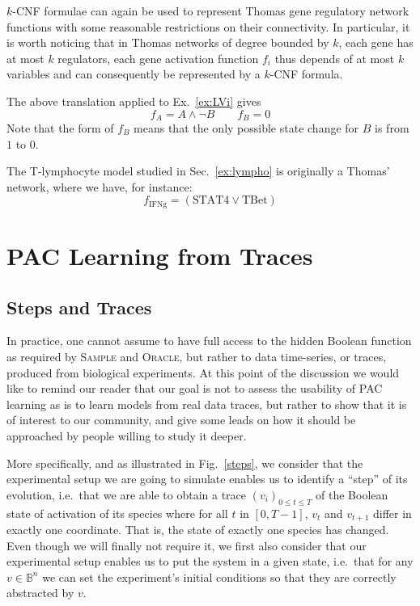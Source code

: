 \documentclass{llncs}
\begin{document}
$k$-CNF formulae can again be used to represent Thomas gene regulatory network functions with some reasonable restrictions on their connectivity.
In particular, it is worth noticing that in Thomas networks of degree bounded by $k$,
each gene has at most $k$ regulators, each gene activation function $f_i$ thus depends of at most $k$ variables
and can consequently be represented by a $k$-CNF formula.

\begin{example}
   The above translation applied to
   Ex.~\ref{ex:LVi} gives
   \[f_A = A \wedge\neg B\qquad f_B = 0\]
   Note that the form of $f_B$ means that the only possible state change
   for $B$ is from $1$ to $0$. 
\end{example}

\begin{example}
   The T-lymphocyte model studied in Sec.~\ref{ex:lympho} is originally a Thomas' network, where we have, for
   instance:
   \[f_\text{IFNg}=(\text{STAT4}\vee \text{TBet})\]
\end{example}

\section{PAC Learning from Traces} %


\subsection{Steps and Traces}

In practice, one cannot assume to have full access to the hidden Boolean function as required by
\textsc{Sample} and \textsc{Oracle}, but rather to data time-series, or traces,
produced from biological experiments. At this point of the discussion we would like to remind our reader that our goal is not to assess the usability of PAC learning as is to learn models from real data traces, but rather to show that it is of interest to our community, and give some leads on how it should be approached by people willing to study it deeper.

More specifically, and as illustrated in Fig.~\ref{steps}, we consider that the experimental setup we are going to simulate enables us to identify a ``step'' of its evolution, i.e.~that we are able to obtain a trace $(v_i)_{0 \leq t \leq T}$ of the Boolean state of activation of its species where for all $t$ in $[0,T-1]$, $v_t$ and $v_{t+1}$ differ in exactly one coordinate. That is, the state of exactly one species has changed.
Even though we will finally not require it, we first also consider that our experimental setup enables us to put the system in a given state, i.e.~that for any $v \in \mathbb{B}^n$ we can set the experiment's initial conditions so that they are correctly abstracted by $v$.
\end{document}
